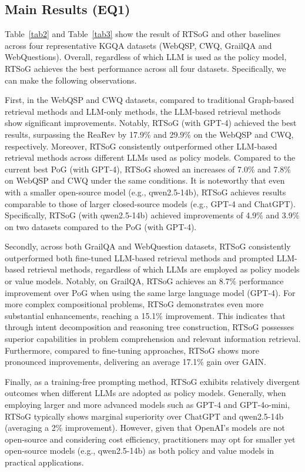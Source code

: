 \documentclass[lettersize,journal]{IEEEtran}
\begin{document}
\subsection{Main Results (EQ1)}
Table~\ref{tab2} and Table~\ref{tab3} show the result of RTSoG and other baselines across four representative KGQA datasets (WebQSP, CWQ, GrailQA and WebQuestions). Overall, regardless of which LLM is used as the policy model, RTSoG achieves the best performance across all four datasets. Specifically, we can make the following observations. 

First, in the WebQSP and CWQ datasets, compared to traditional Graph-based retrieval methods and LLM-only methods, the LLM-based retrieval methods show significant improvements. Notably, RTSoG (with GPT-4) achieved the best results, surpassing the ReaRev by 17.9\% and 29.9\% on the WebQSP and CWQ, respectively. Moreover, RTSoG consistently outperformed other LLM-based retrieval methods across different LLMs used as policy models. Compared to the current best PoG (with GPT-4), RTSoG showed an increases of 7.0\% and 7.8\% on WebQSP and CWQ under the same conditions. It is noteworthy that even with a smaller open-source model (e.g., qwen2.5-14b), RTSoG achieves results comparable to those of larger closed-source models (e.g., GPT-4 and ChatGPT). Specifically, RTSoG (with qwen2.5-14b) achieved improvements of 4.9\% and 3.9\% on two datasets compared to the PoG (with GPT-4). 

Secondly, across both GrailQA and WebQuestion datasets, RTSoG consistently outperformed both fine-tuned LLM-based retrieval methods and prompted LLM-based retrieval methods, regardless of which LLMs are employed as policy models or value models. Notably, on GrailQA, RTSoG achieves an 8.7\% performance improvement over PoG when using the same large language model (GPT-4). For more complex compositional problems, RTSoG demonstrates even more substantial enhancements, reaching a 15.1\% improvement. 
This indicates that through intent decomposition and reasoning tree construction, RTSoG possesses superior capabilities in problem comprehension and relevant information retrieval. Furthermore, compared to fine-tuning approaches, RTSoG shows more pronounced improvements, delivering an average 17.1\% gain over GAIN.

Finally, as a training-free prompting method, RTSoG exhibits relatively divergent outcomes when different LLMs are adopted as policy models. Generally, when employing larger and more advanced models such as GPT-4 and GPT-4o-mini, RTSoG typically shows marginal superiority over ChatGPT and qwen2.5-14b (averaging a 2\% improvement). However, given that OpenAI's models are not open-source and considering cost efficiency, practitioners may opt for smaller yet open-source models (e.g., qwen2.5-14b) as both policy and value models in practical applications.
\end{document}
